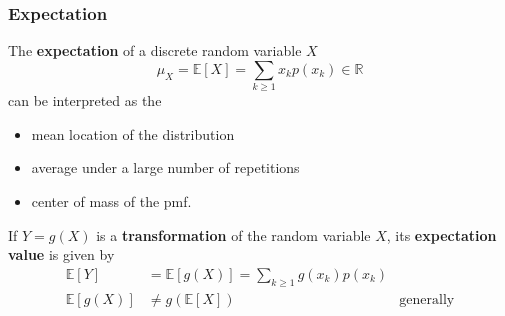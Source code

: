 \subsubsection{Expectation}
The \textbf{expectation} of a discrete random variable $X$
\noindent\begin{equation*}
    \mu_{X}=\mathbb{E}[X]=\sum_{k\geq1}x_{k}p(x_{k})\in\mathbb{R}
\end{equation*}
can be interpreted as the
\begin{itemize}
    \item mean location of the distribution
    \item average under a large number of repetitions
    \item center of mass of the pmf.
\end{itemize}

\newpar{}
If $Y=g(X)$ is a \textbf{transformation} of the random variable $X$, its \textbf{expectation value} is given by
\noindent\begin{align*}
    \mathbb{E}[Y]    & =\mathbb{E}[g(X)]=\sum_{k\geq1}g(x_{k})p(x_{k})                    \\
    \mathbb{E}[g(X)] & \neq g(\mathbb{E}[X])                           & \text{generally}
\end{align*}

